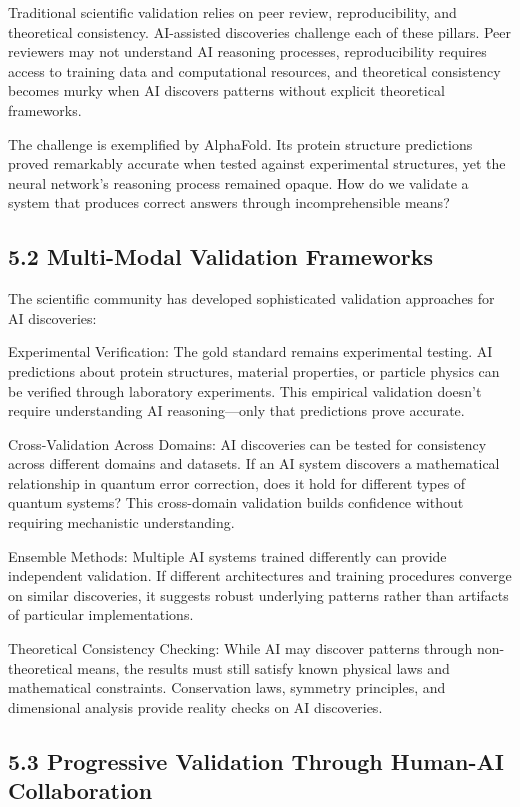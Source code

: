 \documentclass{article}
\begin{document}
Traditional scientific validation relies on peer review, reproducibility, and theoretical consistency. AI-assisted discoveries challenge each of these pillars. Peer reviewers may not understand AI reasoning processes, reproducibility requires access to training data and computational resources, and theoretical consistency becomes murky when AI discovers patterns without explicit theoretical frameworks.


The challenge is exemplified by AlphaFold. Its protein structure predictions proved remarkably accurate when tested against experimental structures, yet the neural network's reasoning process remained opaque. How do we validate a system that produces correct answers through incomprehensible means?


\subsection{5.2 Multi-Modal Validation Frameworks}

The scientific community has developed sophisticated validation approaches for AI discoveries:


Experimental Verification: The gold standard remains experimental testing. AI predictions about protein structures, material properties, or particle physics can be verified through laboratory experiments. This empirical validation doesn't require understanding AI reasoning—only that predictions prove accurate.


Cross-Validation Across Domains: AI discoveries can be tested for consistency across different domains and datasets. If an AI system discovers a mathematical relationship in quantum error correction, does it hold for different types of quantum systems? This cross-domain validation builds confidence without requiring mechanistic understanding.


Ensemble Methods: Multiple AI systems trained differently can provide independent validation. If different architectures and training procedures converge on similar discoveries, it suggests robust underlying patterns rather than artifacts of particular implementations.


Theoretical Consistency Checking: While AI may discover patterns through non-theoretical means, the results must still satisfy known physical laws and mathematical constraints. Conservation laws, symmetry principles, and dimensional analysis provide reality checks on AI discoveries.


\subsection{5.3 Progressive Validation Through Human-AI Collaboration}
\end{document}
